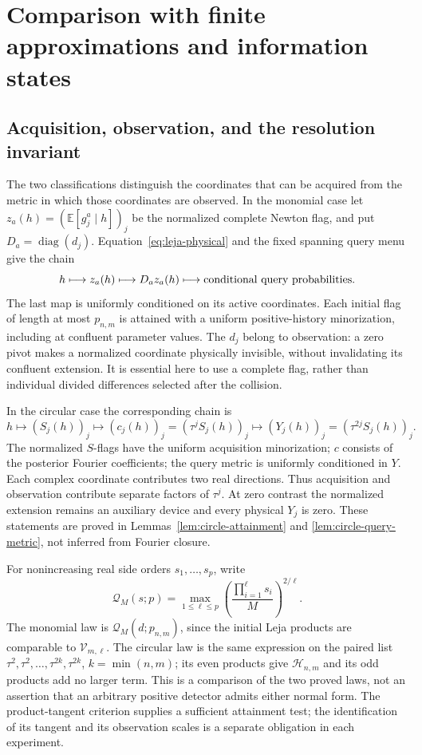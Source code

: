 \documentclass[11pt]{amsart}
\theoremstyle{definition}\newtheorem{definition}[theorem]{Definition}
\theoremstyle{remark}\newtheorem{remark}[theorem]{Remark}
\newcommand{\E}{\mathbb E}\newcommand{\Prob}{\mathbb P}
\begin{document}
\section{Comparison with finite approximations and information states}
\label{sec:literature-comparison}
\subsection{Acquisition, observation, and the resolution invariant}
\label{sec:acquisition-observation-comparison}
The two classifications distinguish the coordinates that can be acquired
from the metric in which those coordinates are observed. In the monomial
case let $z_a(h)=(\E[g_j^a\mid h])_j$ be the normalized complete Newton
flag, and put $D_a=\operatorname{diag}(d_j)$. Equation~\eqref{eq:leja-physical}
and the fixed spanning query menu give the chain
\[
 h\longmapsto z_a(h)\longmapsto D_a z_a(h)
       \longmapsto\hbox{conditional query probabilities}.
\]
The last map is uniformly conditioned on its active coordinates. Each
initial flag of length at most $p_{n,m}$ is attained with a uniform
positive-history minorization, including at confluent parameter values.
The $d_j$ belong to observation: a zero pivot makes a normalized
coordinate physically invisible, without invalidating its confluent
extension. It is essential here to use a complete flag, rather than
individual divided differences selected after the collision.

In the circular case the corresponding chain is
\[
 h\longmapsto(S_j(h))_j
   \longmapsto(c_j(h))_j=(\tau^jS_j(h))_j
   \longmapsto(Y_j(h))_j=(\tau^{2j}S_j(h))_j.
\]
The normalized $S$-flags have the uniform acquisition minorization;
$c$ consists of the posterior Fourier coefficients; the query metric is
uniformly conditioned in $Y$. Each complex coordinate contributes two
real directions. Thus acquisition and observation contribute separate
factors of $\tau^j$. At zero contrast the normalized extension remains
an auxiliary device and every physical $Y_j$ is zero. These statements
are proved in Lemmas~\ref{lem:circle-attainment} and
\ref{lem:circle-query-metric}, not inferred from Fourier closure.

For nonincreasing real side orders $s_1,\ldots,s_p$, write
\[
 \mathcal Q_M(s;p)=\max_{1\le\ell\le p}
       \left(\frac{\prod_{i=1}^{\ell}s_i}{M}\right)^{2/\ell}.
\]
The monomial law is $\mathcal Q_M(d;p_{n,m})$, since the initial
Leja products are comparable to $\mathcal V_{m,\ell}$. The circular
law is the same expression on the paired list
$\tau^2,\tau^2,\ldots,\tau^{2k},\tau^{2k}$, $k=\min(n,m)$;
its even products give $\mathcal H_{n,m}$ and its odd products add
no larger term. This is a comparison of the two proved laws, not an
assertion that an arbitrary positive detector admits either normal form.
The product-tangent criterion supplies a sufficient attainment test;
the identification of its tangent and its observation scales is a
separate obligation in each experiment.
\end{document}
